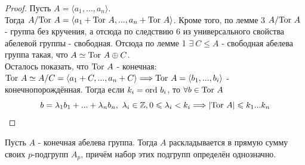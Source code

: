\begin{proof}
    Пусть $A = \langle a_1,...,a_n \rangle$. \\
    Тогда $A/\textup{Tor } A = \langle a_1 + \textup{Tor } A,...,a_n + \textup{Tor } A\rangle$. Кроме того, по лемме 3 $A/\textup{Tor } A$ - группа без кручения, а отсюда по следствию 6 из универсального свойства абелевой группы - свободная. Отсюда по лемме 1 $\exists \ C \leq A$ - свободная абелева группа такая, что $A \simeq \textup{Tor } A \oplus C$.\\
    Осталось показать, что $\textup{Tor } A$ - конечная:
    $\textup{Tor } A \simeq A/C = \langle a_1 + C,...,a_n + C \rangle \Longrightarrow \textup{Tor } A = \langle b_1,...,b_i \rangle$ - конечнопорождённая.
    Тогда если $k_i = \textup{ord } b_i$, то $\forall b \in \textup{Tor } A$
    \[b = \lambda_1b_1 + ... + \lambda_nb_n, \ \lambda_i \in \Z, 0 \leqslant \lambda_i < k_i \Longrightarrow |\textup{Tor } A| \leqslant k_1...k_n \]
\end{proof}
\begin{lemmanum}
    Пусть $A$ - конечная абелева группа. Тогда $A$ раскладывается в прямую сумму своих $p$-подгрупп $A_p$, причём набор этих подгрупп определён однозначно.
\end{lemmanum}
